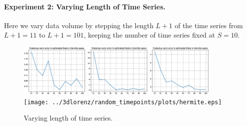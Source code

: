 \documentclass{article}
\begin{document}
\paragraph{Experiment 2: Varying Length of Time Series.} Here we vary data volume by stepping the length $L+1$ of the time series from $L+1 = 11$ to $L+1 = 101$, keeping the number of time series fixed at $S=10$.

\begin{figure}[th]
\includegraphics[height=1in]{../1dcode/random_timepoints/plots/hermite.eps}
\includegraphics[height=1in]{../2dcode/random_timepoints/plots/hermite.eps}
\includegraphics[height=1in]{../3ddampedduffing/random_timepoints/plots/hermite.eps}
\texttt{[image: ../3dlorenz/random\_timepoints/plots/hermite.eps]}
\caption{Varying length of time series.}
\label{fig:exp2}
\end{figure}
\end{document}

